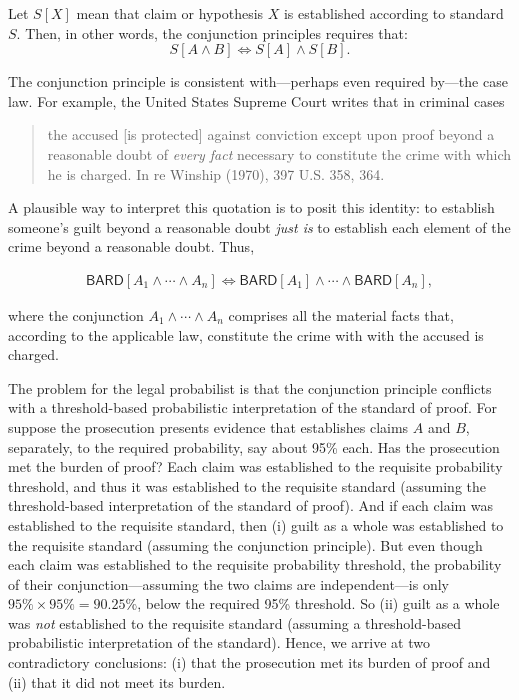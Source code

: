 \documentclass[10pt,dvipsnames,enabledeprecatedfontcommands]{scrartcl}
\newcommand{\et}{\wedge}
\begin{document}
\noindent Let \(S[X]\) mean that claim or hypothesis \(X\) is
established according to standard \(S\). Then, in other words, the
conjunction principles requires that:
\[S[A \wedge B] \Leftrightarrow S[A] \wedge S[B].\]

The conjunction principle is consistent with---perhaps even required
by---the case law. For example, the United States Supreme Court writes
that in criminal cases

\begin{quote}
the accused [is protected] against conviction except upon proof beyond a reasonable doubt of \textit{every fact} necessary to constitute the crime with which he is charged. In re Winship (1970), 397 U.S. 358, 364. 
\end{quote}

\noindent A plausible way to interpret this quotation is to posit this
identity: to establish someone's guilt beyond a reasonable doubt
\textit{just is} to establish each element of the crime beyond a
reasonable doubt. Thus,

\begin{align*}\mathsf{BARD}[A_1 \wedge \cdots \wedge A_n] \Leftrightarrow \mathsf{BARD}[A_1] \wedge \cdots \wedge \mathsf{BARD}[A_n],
\end{align*}

\noindent where the conjunction \(A_1 \et \cdots \et A_n\) comprises all
the material facts that, according to the applicable law, constitute the
crime with with the accused is charged.

The problem for the legal probabilist is that the conjunction principle
conflicts with a threshold-based probabilistic interpretation of the
standard of proof. For suppose the prosecution presents evidence that
establishes claims \(A\) and \(B\), separately, to the required
probability, say about 95\% each. Has the prosecution met the burden of
proof? Each claim was established to the requisite probability
threshold, and thus it was established to the requisite standard
(assuming the threshold-based interpretation of the standard of proof).
And if each claim was established to the requisite standard, then (i)
guilt as a whole was established to the requisite standard (assuming the
conjunction principle). But even though each claim was established to
the requisite probability threshold, the probability of their
conjunction---assuming the two claims are independent---is only
\(95\%\times95\%=90.25\%\), below the required 95\% threshold. So (ii)
guilt as a whole was \textit{not} established to the requisite standard
(assuming a threshold-based probabilistic interpretation of the
standard). Hence, we arrive at two contradictory conclusions: (i) that
the prosecution met its burden of proof and (ii) that it did not meet
its burden.
\end{document}

